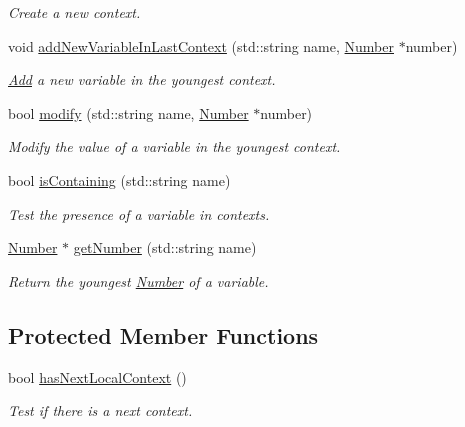 \begin{DoxyCompactItemize}
\begin{DoxyCompactList}\small\item\em Create a new context. \end{DoxyCompactList}\item 
void \hyperlink{class_context_a0923de09c4e6e42ba5ab96ca961af86b}{add\-New\-Variable\-In\-Last\-Context} (std\-::string name, \hyperlink{class_number}{Number} $\ast$number)
\begin{DoxyCompactList}\small\item\em \hyperlink{class_add}{Add} a new variable in the youngest context. \end{DoxyCompactList}\item 
bool \hyperlink{class_context_a00cf96423533f26bf1457f181e47a885}{modify} (std\-::string name, \hyperlink{class_number}{Number} $\ast$number)
\begin{DoxyCompactList}\small\item\em Modify the value of a variable in the youngest context. \end{DoxyCompactList}\item 
bool \hyperlink{class_context_a4e5513c1557b91b9ba4897ca6239e664}{is\-Containing} (std\-::string name)
\begin{DoxyCompactList}\small\item\em Test the presence of a variable in contexts. \end{DoxyCompactList}\item 
\hyperlink{class_number}{Number} $\ast$ \hyperlink{class_context_a0924ac4b20a004cc5d87b0b360111832}{get\-Number} (std\-::string name)
\begin{DoxyCompactList}\small\item\em Return the youngest \hyperlink{class_number}{Number} of a variable. \end{DoxyCompactList}\end{DoxyCompactItemize}
\subsection*{Protected Member Functions}
\begin{DoxyCompactItemize}
\item 
bool \hyperlink{class_context_a84b15fffee0ce1176cb995122f0573b9}{has\-Next\-Local\-Context} ()
\begin{DoxyCompactList}\small\item\em Test if there is a next context. \end{DoxyCompactList}\end{DoxyCompactItemize}
